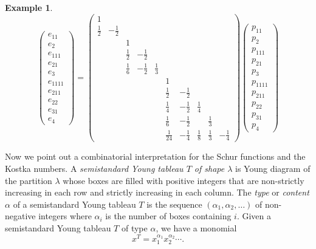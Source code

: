 \documentclass[12pt]{article}
\theoremstyle{plain}
\theoremstyle{definition}
\newtheorem{example}[theorem]{Example}
\theoremstyle{remark}
\numberwithin{equation}{section}
\begin{document}
\begin{example}
\[
\begin{pmatrix} e_{11}\\ e_2\\ e_{111}\\ e_{21}\\ e_3\\
e_{1111}\\ e_{211} \\ e_{22}\\ e_{31}\\ e_4
\end{pmatrix}
=
\begin{pmatrix}
1 & &
 & & &
& & & & \\
\frac{1}{2} & -\frac{1}{2} &
 & & &
& & & & \\
 & &
1 & & &
& & & & \\
 & &
\frac{1}{2} & -\frac{1}{2} &  &
& & & & \\
 & &
\frac{1}{6} & -\frac{1}{2} & \frac{1}{3} &
& & & & \\
 & &
 & & &
1 & & & & \\
 & &
 & & &
\frac{1}{2} & -\frac{1}{2} & & & \\
 & &
 & & &
\frac{1}{4} & -\frac{1}{2} & \frac{1}{4} & & \\
 & &
 & & &
\frac{1}{6} & -\frac{1}{2} & & \frac{1}{3} & \\
 & &
 & & &
\frac{1}{24} & -\frac{1}{4} & \frac{1}{8} & \frac{1}{3} & -\frac{1}{4}
\end{pmatrix} 
\begin{pmatrix}
p_{11}\\ p_2\\ p_{111}\\ p_{21}\\ p_3\\
p_{1111}\\ p_{211} \\ p_{22}\\ p_{31}\\ p_4
\end{pmatrix}
\]
\end{example}

Now we point out a combinatorial interpretation for the Schur functions
and the Kostka numbers.
A \emph{semistandard Young tableau $T$ of shape $\lambda$}
is Young diagram of the partition $\lambda$ whose boxes are filled with
positive integers that are non-strictly increasing in each row
and strictly increasing in each column.
The \emph{type} or \emph{content} $\alpha$ of a semistandard Young tableau
$T$ is the sequence
$(\alpha_1,\alpha_2,\ldots)$ of non-negative integers
where $\alpha_i$ is the number of boxes containing $i$.
Given a semistandard Young tableau $T$ of type $\alpha$,
we have a monomial
\[
x^T = x_1^{\alpha_1}x_2^{\alpha_2} \cdots .
\]
\end{document}
